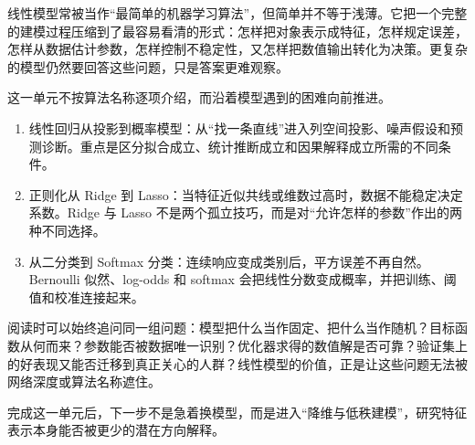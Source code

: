 线性模型常被当作``最简单的机器学习算法''，但简单并不等于浅薄。它把一个完整的建模过程压缩到了最容易看清的形式：怎样把对象表示成特征，怎样规定误差，怎样从数据估计参数，怎样控制不稳定性，又怎样把数值输出转化为决策。更复杂的模型仍然要回答这些问题，只是答案更难观察。

这一单元不按算法名称逐项介绍，而沿着模型遇到的困难向前推进。

\begin{enumerate}
\def\labelenumi{\arabic{enumi}.}
\tightlist
\item
  线性回归从投影到概率模型：从``找一条直线''进入列空间投影、噪声假设和预测诊断。重点是区分拟合成立、统计推断成立和因果解释成立所需的不同条件。
\item
  正则化从 Ridge 到 Lasso：当特征近似共线或维数过高时，数据不能稳定决定系数。Ridge 与 Lasso 不是两个孤立技巧，而是对``允许怎样的参数''作出的两种不同选择。
\item
  从二分类到 Softmax 分类：连续响应变成类别后，平方误差不再自然。Bernoulli 似然、log-odds 和 softmax 会把线性分数变成概率，并把训练、阈值和校准连接起来。
\end{enumerate}

阅读时可以始终追问同一组问题：模型把什么当作固定、把什么当作随机？目标函数从何而来？参数能否被数据唯一识别？优化器求得的数值解是否可靠？验证集上的好表现又能否迁移到真正关心的人群？线性模型的价值，正是让这些问题无法被网络深度或算法名称遮住。

完成这一单元后，下一步不是急着换模型，而是进入``降维与低秩建模''，研究特征表示本身能否被更少的潜在方向解释。
